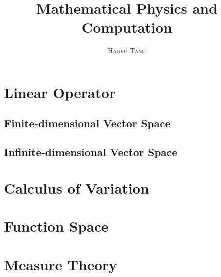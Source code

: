 \documentclass[a4paper,11pt,oneside]{book}
\title{\Huge \textbf{Mathematical Physics and Computation}}
\author{\textsc{Haoyu Tang}}
\begin{document}
\sloppy

\frontmatter
\maketitle

\tableofcontents

\mainmatter

% 
% 

\section{Linear Operator}

\subsection{Finite-dimensional Vector Space}





\subsection{Infinite-dimensional Vector Space}







\section{Calculus of Variation}





\section{Function Space}



\section{Measure Theory}
\end{document}
